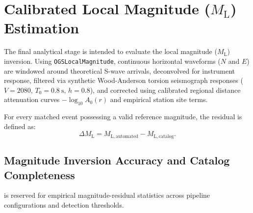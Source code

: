 \section{Calibrated Local Magnitude ($M_{\mathrm{L}}$) Estimation}
\label{sec:magnitude_benchmarking}

The final analytical stage is intended to evaluate the local magnitude
($M_{\mathrm{L}}$) inversion. Using \texttt{OGSLocalMagnitude},
continuous horizontal waveforms ($N$ and $E$) are windowed around
theoretical S-wave arrivals, deconvolved for instrument response,
filtered via synthetic Wood-Anderson torsion seismograph responses
($V = 2080$, $T_0 = \qty{0.8}{\second}$, $h = 0.8$), and corrected using
calibrated regional distance attenuation curves $-\log_{10} A_0(r)$
and empirical station site terms.

For every matched event possessing a valid reference magnitude, the
residual is defined as:
\begin{equation}
  \Delta M_{\mathrm{L}} = M_{\mathrm{L}, \mathrm{automated}} -
  M_{\mathrm{L}, \mathrm{catalog}}.
\end{equation}

\subsection{Magnitude Inversion Accuracy and Catalog Completeness}
\label{subsec:magnitude_residuals}

 is reserved for empirical
magnitude-residual statistics across pipeline configurations and
detection thresholds.

